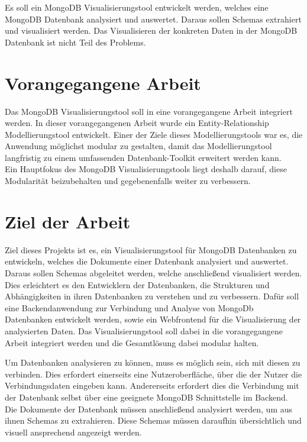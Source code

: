 Es soll ein MongoDB Visualisierungstool entwickelt werden, welches eine MongoDB Datenbank analysiert und auswertet.
Daraus sollen Schemas extrahiert und visualisiert werden.
Das Visualisieren der konkreten Daten in der MongoDB Datenbank ist nicht Teil des Problems.

\section{Vorangegangene Arbeit}
\label{sec:vorangegangene_arbeit}

Das MongoDB Visualisierungstool soll in eine vorangegangene Arbeit integriert werden.
In dieser vorangegangenen Arbeit wurde ein Entity-Relationship Modellierungstool entwickelt.
Einer der Ziele dieses Modellierungstools war es, die Anwendung möglichst modular zu gestalten, damit das Modellierungstool langfristig zu einem umfassenden Datenbank-Toolkit erweitert werden kann.
~\autocite{ruttmann:projektarbeit}
Ein Hauptfokus des MongoDB Visualisierungstools liegt deshalb darauf, diese Modularität beizubehalten und gegebenenfalls weiter zu verbessern.

\section{Ziel der Arbeit}
\label{sec:ziel}

Ziel dieses Projekts ist es, ein Visualisierungstool für MongoDB Datenbanken zu entwickeln, welches die Dokumente einer Datenbank analysiert und auswertet.
Daraus sollen Schemas abgeleitet werden, welche anschließend visualisiert werden.
Dies erleichtert es den Entwicklern der Datenbanken, die Strukturen und Abhängigkeiten in ihren Datenbanken zu verstehen und zu verbessern.
Dafür soll eine Backendanwendung zur Verbindung und Analyse von MongoDb Datenbanken entwickelt werden, sowie ein Webfrontend für die Visualisierung der analysierten Daten.
Das Visualisierungstool soll dabei in die vorangegangene Arbeit integriert werden und die Gesamtlösung dabei modular halten.

Um Datenbanken analysieren zu können, muss es möglich sein, sich mit diesen zu verbinden.
Dies erfordert einerseits eine Nutzeroberfläche, über die der Nutzer die Verbindungsdaten eingeben kann.
Andererseits erfordert dies die Verbindung mit der Datenbank selbst über eine geeignete MongoDB Schnittstelle im Backend.
Die Dokumente der Datenbank müssen anschließend analysiert werden, um aus ihnen Schemas zu extrahieren.
Diese Schemas müssen daraufhin übersichtlich und visuell ansprechend angezeigt werden.

